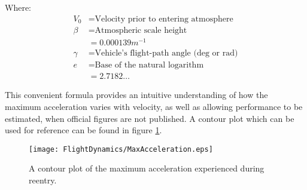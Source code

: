 Where:
\begin{align*}
V_0 &= \text{Velocity prior to entering atmosphere}\\
 \beta &= \text{Atmospheric scale height}\\
       &= 0.000139 m^{-1}\\
\gamma &= \text{Vehicle's flight-path angle (deg or rad)}\\
     e &= \text{Base of the natural logarithm}\\
       &= 2.7182\ldots
\end{align*}

This convenient formula provides an intuitive understanding of how the maximum acceleration varies with velocity, as well as allowing performance to be estimated, when official figures are not published. A contour plot which can be used for reference can be found in figure \ref{fig:MaxReentryAcceleration}.


\begin{figure}[!htb] 
    \centering
    \texttt{[image: FlightDynamics/MaxAcceleration.eps]} 
    \caption{A contour plot of the maximum acceleration experienced during reentry.}
    \label{fig:MaxReentryAcceleration}
\end{figure}


